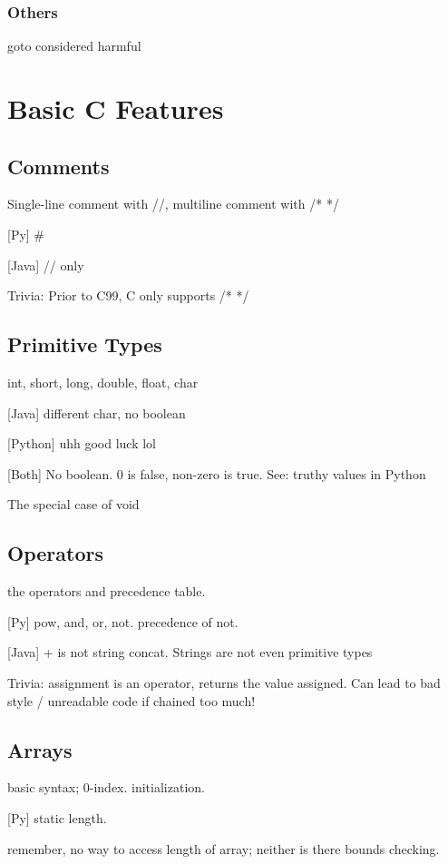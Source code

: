 \documentclass[oneside]{book}
\theoremstyle{definition}
\begin{document}
        \subsection{Others}
        goto considered harmful

\chapter{Basic C Features}
    \section{Comments}
    Single-line comment with //, multiline comment with /* */ 
    
    [Py] \#
    
    [Java] // only
    
    Trivia: Prior to C99, C only supports /* */

    
    \section{Primitive Types}
    int, short, long, double, float, char

    [Java] different char, no boolean

    [Python] uhh good luck lol 

    [Both] No boolean. 0 is false, non-zero is true. See: truthy values in Python

    The special case of void
    
    \section{Operators}
    the operators and precedence table.

    [Py] pow, and, or, not. precedence of not.

    [Java] + is not string concat. Strings are not even primitive types

    Trivia: assignment is an operator, returns the value assigned. Can lead to bad style / unreadable code if chained too much!
    
    \section{Arrays}
    basic syntax; 0-index. initialization.

    [Py] static length.
    
    remember, no way to access length of array; neither is there bounds checking.
    
\end{document}
